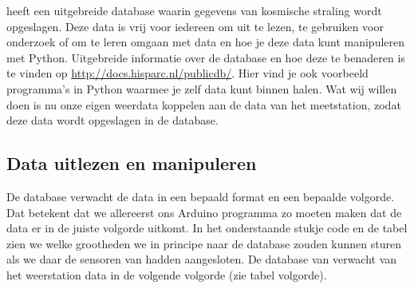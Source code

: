 \hisparc heeft een uitgebreide database waarin gegevens van kosmische straling
wordt opgeslagen. Deze data is vrij voor iedereen om uit te lezen, te
gebruiken voor onderzoek of om te leren omgaan met data en hoe je deze data
kunt manipuleren met Python. Uitgebreide informatie over de \hisparc database
en hoe deze te benaderen is te vinden op
\url{http://docs.hisparc.nl/publicdb/}. Hier vind je ook voorbeeld programma's
in Python waarmee je zelf data kunt binnen halen. Wat wij willen doen is nu
onze eigen weerdata koppelen aan de data van het \hisparc meetstation, zodat
deze data wordt opgeslagen in de \hisparc database.


\subsection{Data uitlezen en manipuleren}

De \hisparc database verwacht de data in een bepaald format en een bepaalde
volgorde. Dat betekent dat we allereerst ons Arduino programma zo moeten maken
dat de data er in de juiste volgorde uitkomt. In het onderstaande stukje code
en de tabel zien we welke grootheden we in principe naar de \hisparc database
zouden kunnen sturen als we daar de sensoren van hadden aangesloten. De
database van \hisparc verwacht van het weerstation data in de volgende
volgorde (zie tabel volgorde).

